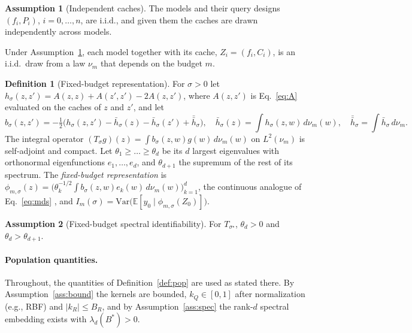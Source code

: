 \documentclass{article}
\theoremstyle{definition}
\newtheorem{definition}{Definition}
\newtheorem{assumption}{Assumption}
\theoremstyle{plain}
\begin{document}
\begin{assumption}[Independent caches]\label{ass:iid}
The models and their query designs $(f_{i},P_{i})$, $i=0,\dots,n$, are i.i.d., and
given them the caches are drawn independently across models.
\end{assumption}
Under Assumption~\ref{ass:iid}, each model together with its cache,
$Z_{i}=(f_{i},C_{i})$, is an i.i.d.\ draw from a law $\nu_{m}$ that depends on the
budget $m$.
\begin{definition}[Fixed-budget representation]\label{def:info}
For $\sigma>0$ let $h_{\sigma}(z,z')=A(z,z)+A(z',z')-2A(z,z')$, where $A(z,z')$ is
Eq.~\eqref{eq:A} evaluated on the caches of $z$ and $z'$, and let
\[
b_{\sigma}(z,z')=-\tfrac12\big(h_{\sigma}(z,z')-\bar h_{\sigma}(z)-\bar h_{\sigma}(z')+\bar{\bar h}_{\sigma}\big),
\quad
\bar h_{\sigma}(z)=\!\int\! h_{\sigma}(z,w)\,d\nu_{m}(w),
\quad
\bar{\bar h}_{\sigma}=\!\int\!\bar h_{\sigma}\,d\nu_{m}.
\]
The integral operator $(T_{\sigma}g)(z)=\int b_{\sigma}(z,w)g(w)\,d\nu_{m}(w)$ on
$L^{2}(\nu_{m})$ is self-adjoint and compact. Let $\theta_{1}\ge\dots\ge\theta_{d}$ be
its $d$ largest eigenvalues with orthonormal eigenfunctions $e_{1},\dots,e_{d}$, and
$\theta_{d+1}$ the supremum of the rest of its spectrum. The \emph{fixed-budget
representation} is
$\phi_{m,\sigma}(z)=\big(\theta_{k}^{-1/2}\int b_{\sigma}(z,w)e_{k}(w)\,d\nu_{m}(w)\big)_{k=1}^{d}$,
the continuous analogue of Eq.~\eqref{eq:mds} , and
$I_{m}(\sigma)=\mathrm{Var}\big(\mathbb{E}[y_{0}\mid\phi_{m,\sigma}(Z_{0})]\big)$.
\end{definition}
\begin{assumption}[Fixed-budget spectral identifiability]\label{ass:specm}
For $T_{\sigma^{\star}}$, $\theta_{d}>0$ and $\theta_{d}>\theta_{d+1}$.
\end{assumption}

\paragraph{Population quantities.} Throughout, the quantities of
Definition~\ref{def:pop} are used as stated there. By Assumption~\ref{ass:bound} the
kernels are bounded, $k_Q\in[0,1]$ after normalization (e.g., RBF) and $|k_R|\le B_R$,
and by Assumption~\ref{ass:spec} the rank-$d$ spectral embedding exists with
$\lambda_d(B^*)>0$.
\end{document}
